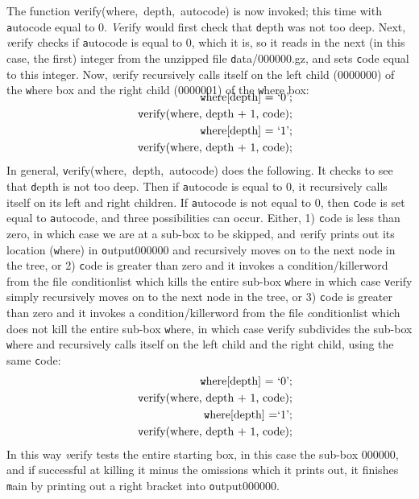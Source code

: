 \begin{remark}
The function \hbox{\texttt verify(where, depth, autocode)} is now invoked; this time with \hbox{\texttt autocode} equal to 0.  {\textit Verify} would first check that \hbox{\texttt depth} was not too deep.  Next, {\textit verify} checks if \hbox{\texttt autocode} is equal to 0, which it is, so it reads in the next (in this case, the first) integer from the unzipped file \hbox{\texttt data/000000.gz}, and sets \hbox{\texttt code} equal to this integer.  Now, {\textit verify} recursively calls itself on the left child (0000000) of the \hbox{\texttt where} box and the right child (0000001) of the
 \hbox{\texttt where} box:
\begin{eqnarray*}
\noalign{\vskip-12pt}
&&
\hbox{\texttt where[depth] = \hbox{`}0\hbox{'};}
\\
&& \hbox{\texttt verify(where, depth + 1, code);}
\\
&&
\hbox{\texttt where[depth] = \hbox{`}1\hbox{'};}
\\
&&\hbox{\texttt verify(where, depth + 1, code);}
\end{eqnarray*}
In general, \hbox{\texttt verify(where, depth, autocode)} does the following.  It checks to see that \hbox{\texttt depth} is not too deep.  Then if \hbox{\texttt autocode} is equal to 0, it recursively calls itself on its left and right children.  If \hbox{\texttt autocode} is not equal to 0, then \hbox{\texttt code} is set equal to \hbox{\texttt autocode}, and
three possibilities can occur.  Either, 
1)  \hbox{\texttt code} is less than zero, in which case we are at 
a sub-box to be skipped, 
 and {\textit verify} prints out its location  (\hbox{\texttt where}) in \hbox{\texttt output000000} and recursively moves on to the next node in the tree, or 
2) \hbox{\texttt code} is greater than zero and it invokes a condition/killerword from the file {\textit conditionlist} which kills the entire sub-box \hbox{\texttt where}
in which case \hbox{\texttt verify} simply recursively moves on to the next node in the tree, or 
3) \hbox{\texttt code} is greater than zero and it invokes a condition/killerword from the file {\textit conditionlist} which does not kill the entire sub-box \hbox{\texttt where}, in which case
\hbox{\texttt verify} subdivides the sub-box \hbox{\texttt where} and recursively calls itself on the left child and the right child, using the same \hbox{\texttt code}:
\begin{eqnarray*}
&&\hbox{\texttt where[depth] = \hbox{`}0\hbox{'};}
\\ &&\hbox{\texttt verify(where, depth + 1, code);}
\\ &&\hbox{\texttt where[depth] =\hbox{`}1\hbox{'};}
\\ &&\hbox{\texttt verify(where, depth + 1, code);}
\end{eqnarray*}
In this way {\textit verify} tests the entire starting box, in this case the sub-box 000000, and if successful at killing
it minus the omissions which it prints out, it finishes \hbox{\texttt main} by printing out a right bracket into \hbox{\texttt output000000}. \end{remark}
  
